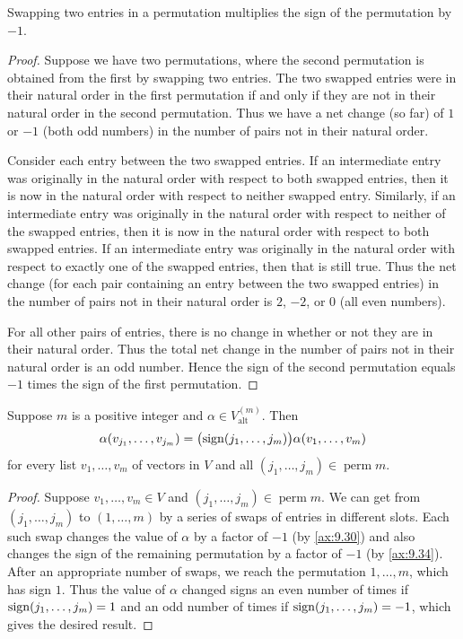 \begin{result}\label{ax:9.34}
Swapping two entries in a permutation multiplies the sign of the permutation
by $-1$.
\end{result}

\begin{proof}
Suppose we have two permutations, where the second permutation is obtained
from the first by swapping two entries. The two swapped entries were in their
natural order in the first permutation if and only if they are not in their
natural order in the second permutation. Thus we have a net change (so far)
of $1$ or $-1$ (both odd numbers) in the number of pairs not in their natural
order.

Consider each entry between the two swapped entries. If an intermediate entry
was originally in the natural order with respect to both swapped entries, then
it is now in the natural order with respect to neither swapped entry.
Similarly, if an intermediate entry was originally in the natural order with
respect to neither of the swapped entries, then it is now in the natural order
with respect to both swapped entries. If an intermediate entry was originally
in the natural order with respect to exactly one of the swapped entries, then
that is still true. Thus the net change (for each pair containing an entry
between the two swapped entries) in the number of pairs not in their natural
order is $2$, $-2$, or $0$ (all even numbers).

For all other pairs of entries, there is no change in whether or not they are
in their natural order. Thus the total net change in the number of pairs not
in their natural order is an odd number. Hence the sign of the second
permutation equals $-1$ times the sign of the first permutation.
\end{proof}

\begin{result}\label{ax:9.35}
Suppose $m$ is a positive integer and $\alpha\in V_{\mathrm{alt}}^{(m)}$. Then
\[ \alpha(v_{j_1},\dots,v_{j_m})
   = \bigl(\operatorname{sign}(j_1,\dots,j_m)\bigr)\alpha(v_1,\dots,v_m) \]
for every list $v_1,\dots,v_m$ of vectors in $V$ and all
$(j_1,\dots,j_m)\in\operatorname{perm} m$.
\end{result}

\begin{proof}
Suppose $v_1,\dots,v_m\in V$ and $(j_1,\dots,j_m)\in\operatorname{perm} m$. We
can get from $(j_1,\dots,j_m)$ to $(1,\dots,m)$ by a series of swaps of entries
in different slots. Each such swap changes the value of $\alpha$ by a factor of
$-1$ (by \ref{ax:9.30}) and also changes the sign of the remaining permutation
by a factor of $-1$ (by \ref{ax:9.34}). After an appropriate number of swaps,
we reach the permutation $1,\dots,m$, which has sign $1$. Thus the value of
$\alpha$ changed signs an even number of times if $\operatorname{sign}(j_1,\dots,j_m)=1$ and
an odd number of times if $\operatorname{sign}(j_1,\dots,j_m)=-1$, which gives the desired
result.
\end{proof}

